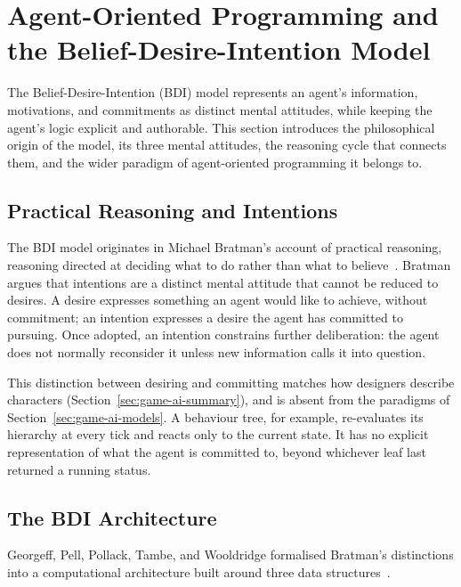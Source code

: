  
\section{Agent-Oriented Programming and the Belief-Desire-Intention Model}
\label{sec:bdi}
 
The Belief-Desire-Intention (BDI) model represents an agent's information, motivations, and commitments as distinct mental attitudes, while keeping the agent's logic explicit and authorable. This section introduces the philosophical origin of the model, its three mental attitudes, the reasoning cycle that connects them, and the wider paradigm of agent-oriented programming it belongs to.
 
\subsection{Practical Reasoning and Intentions}
\label{sec:bdi-origins}
 
The BDI model originates in Michael Bratman's account of practical reasoning, reasoning directed at deciding what to do rather than what to believe~\cite{Bratman1987}. Bratman argues that intentions are a distinct mental attitude that cannot be reduced to desires. A desire expresses something an agent would like to achieve, without commitment; an intention expresses a desire the agent has committed to pursuing. Once adopted, an intention constrains further deliberation: the agent does not normally reconsider it unless new information calls it into question.
 
This distinction between desiring and committing matches how designers describe characters (Section~\ref{sec:game-ai-summary}), and is absent from the paradigms of Section~\ref{sec:game-ai-models}. A behaviour tree, for example, re-evaluates its hierarchy at every tick and reacts only to the current state. It has no explicit representation of what the agent is committed to, beyond whichever leaf last returned a running status.
 
\subsection{The BDI Architecture}
\label{sec:bdi-architecture}
 
Georgeff, Pell, Pollack, Tambe, and Wooldridge formalised Bratman's distinctions into a computational architecture built around three data structures~\cite{Georgeff1999}.
 
